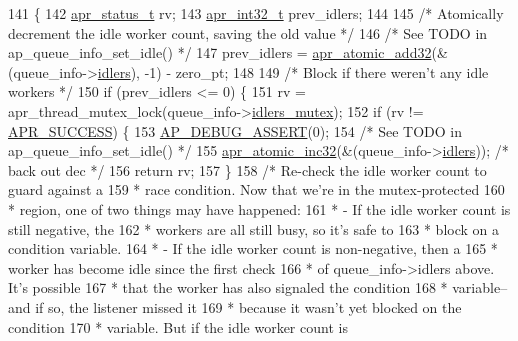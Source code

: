 \begin{DoxyCode}
141 \{
142     \hyperlink{group__apr__errno_gaa5105fa83cc322f09382292db8b47593}{apr\_status\_t} rv;
143     \hyperlink{group__apr__platform_ga21ef1e35fd3ff9be386f3cb20164ff02}{apr\_int32\_t} prev\_idlers;
144 
145     \textcolor{comment}{/* Atomically decrement the idle worker count, saving the old value */}
146     \textcolor{comment}{/* See TODO in ap\_queue\_info\_set\_idle() */}
147     prev\_idlers = \hyperlink{atomic_8c_a3ef16e13b679710fafd5196713e17433}{apr\_atomic\_add32}(&(queue\_info->\hyperlink{structfd__queue__info__t_a34f88b2125fb629dd4200cf75568bb1d}{idlers}), -1) - zero\_pt;
148 
149     \textcolor{comment}{/* Block if there weren't any idle workers */}
150     \textcolor{keywordflow}{if} (prev\_idlers <= 0) \{
151         rv = apr\_thread\_mutex\_lock(queue\_info->\hyperlink{structfd__queue__info__t_a18d58b9d46ec7629daee1c309161b8d0}{idlers\_mutex});
152         \textcolor{keywordflow}{if} (rv != \hyperlink{group__apr__errno_ga9ee311b7bf1c691dc521d721339ee2a6}{APR\_SUCCESS}) \{
153             \hyperlink{group__APACHE__CORE__DAEMON_ga85dbc1e4d9600422461f815193f8ace8}{AP\_DEBUG\_ASSERT}(0);
154             \textcolor{comment}{/* See TODO in ap\_queue\_info\_set\_idle() */}
155             \hyperlink{atomic_8c_a4af33da5aa6493ec321af14bedfc47a9}{apr\_atomic\_inc32}(&(queue\_info->\hyperlink{structfd__queue__info__t_a34f88b2125fb629dd4200cf75568bb1d}{idlers}));    \textcolor{comment}{/* back out dec */}
156             \textcolor{keywordflow}{return} rv;
157         \}
158         \textcolor{comment}{/* Re-check the idle worker count to guard against a}
159 \textcolor{comment}{         * race condition.  Now that we're in the mutex-protected}
160 \textcolor{comment}{         * region, one of two things may have happened:}
161 \textcolor{comment}{         *   - If the idle worker count is still negative, the}
162 \textcolor{comment}{         *     workers are all still busy, so it's safe to}
163 \textcolor{comment}{         *     block on a condition variable.}
164 \textcolor{comment}{         *   - If the idle worker count is non-negative, then a}
165 \textcolor{comment}{         *     worker has become idle since the first check}
166 \textcolor{comment}{         *     of queue\_info->idlers above.  It's possible}
167 \textcolor{comment}{         *     that the worker has also signaled the condition}
168 \textcolor{comment}{         *     variable--and if so, the listener missed it}
169 \textcolor{comment}{         *     because it wasn't yet blocked on the condition}
170 \textcolor{comment}{         *     variable.  But if the idle worker count is}

\end{DoxyCode}
